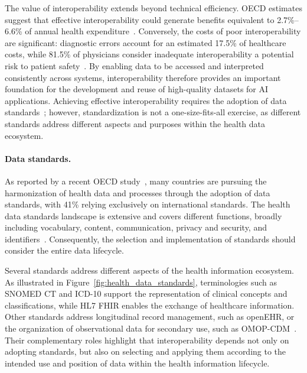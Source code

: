 The value of interoperability extends beyond technical efficiency. OECD estimates suggest that effective interoperability could generate benefits equivalent to 2.7\%--6.6\% of annual health expenditure~\cite{oecd_interoperability_2026}. Conversely, the costs of poor interoperability are significant: diagnostic errors account for an estimated 17.5\% of healthcare costs, while 81.5\% of physicians consider inadequate interoperability a potential risk to patient safety~\cite{oecd_interoperability_2026}. By enabling data to be accessed and interpreted consistently across systems, interoperability therefore provides an important foundation for the development and reuse of high-quality datasets for AI applications. Achieving effective interoperability requires the adoption of data standards~\cite{oecd_interoperability_2026}; however, standardization is not a one-size-fits-all exercise, as different standards address different aspects and purposes within the health data ecosystem.

\paragraph{Data standards.}

As reported by a recent OECD study~\cite{oecd_interoperability_2026}, many countries are pursuing the harmonization of health data and processes through the adoption of data standards, with 41\% relying exclusively on international standards. The health data standards landscape is extensive and covers different functions, broadly including vocabulary, content, communication, privacy and security, and identifiers~\cite{oecd_interoperability_2026}. Consequently, the selection and implementation of standards should consider the entire data lifecycle.

Several standards address different aspects of the health information ecosystem. As illustrated in Figure~\ref{fig:health_data_standards}, terminologies such as SNOMED CT and ICD-10 support the representation of clinical concepts and classifications, while HL7 FHIR enables the exchange of healthcare information. Other standards address longitudinal record management, such as openEHR, or the organization of observational data for secondary use, such as OMOP-CDM~\cite{oecd_interoperability_2026}. Their complementary roles highlight that interoperability depends not only on adopting standards, but also on selecting and applying them according to the intended use and position of data within the health information lifecycle.


